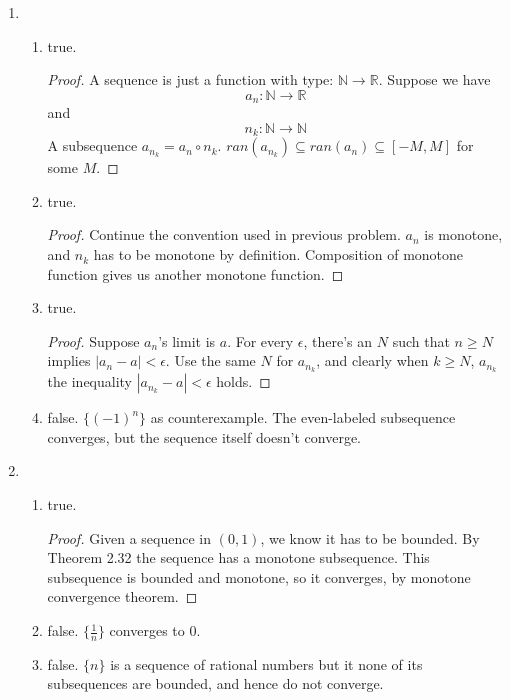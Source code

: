 \documentclass{article}
\begin{document}

\begin{enumerate}
\item
  \begin{enumerate}[label=\alph*.]
  \item true.
    \begin{proof}
      A sequence is just a function with type:
      $\mathbb{N} \rightarrow \mathbb{R}$.  Suppose we have
      \[a_n: \mathbb{N} \rightarrow \mathbb{R}\] and
      \[n_k: \mathbb{N} \rightarrow \mathbb{N}\] A subsequence
      $a_{n_{k}}=a_n \circ n_k$. $ran(a_{n_k}) \subseteq ran(a_n)
      \subseteq [-M,M]$ for some $M$.
    \end{proof}
  \item true.
    \begin{proof}
      Continue the convention used in previous problem. $a_n$ is
      monotone, and $n_k$ has to be monotone by
      definition. Composition of monotone function gives us another
      monotone function.
    \end{proof}
  \item true.
    \begin{proof}
      Suppose $a_n$'s limit is $a$.
      For every $\epsilon$, there's an $N$ such that $n \geq N$
      implies $|a_n - a| < \epsilon$. Use the same $N$ for $a_{n_k}$,
      and clearly when $k \geq N$, $a_{n_k}$ the inequality $|a_{n_k}-a| <
      \epsilon$ holds.
    \end{proof}
  \item false. $\{(-1)^n\}$ as counterexample. The even-labeled
    subsequence converges, but the sequence itself doesn't converge.
  \end{enumerate}
\item
  \begin{enumerate}[label=\alph*.]
  \item true.
    \begin{proof}
      Given a sequence in $(0,1)$, we know it has to be bounded. By
      Theorem 2.32 the sequence has a monotone subsequence. This
      subsequence is bounded and monotone, so it converges, by
      monotone convergence theorem.
    \end{proof}
      
    \item false. $\{\frac{1}{n}\}$ converges to $0$.
    \item false. $\{n\}$ is a sequence of rational numbers but it none
      of its subsequences are bounded, and hence do not converge.
      

\end{enumerate}
\end{enumerate}
\end{document}
